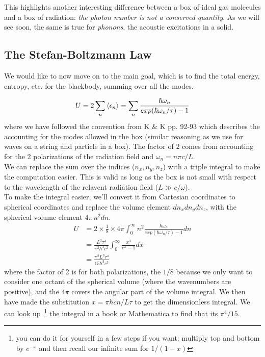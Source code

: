 This highlights another interesting difference between
a box of ideal gas molecules and a box of radiation: \emph{the photon number is
not a conserved quantity}. As we will see soon, the same is true for 
\textit{phonons}, the acoustic excitations in a solid.


\subsection{The Stefan-Boltzmann Law}
We would like to now move on to the main goal, which is to find the total energy,
entropy, etc. for the blackbody, summing over all the modes.

\begin{equation}
U = 2 \sum_n \Braket{\epsilon_n} = 
\sum_n \frac{\hbar \omega_n}{exp(\hbar \omega_n / \tau) - 1}
\end{equation}
where we have followed the convention from K \& K pp. 92-93 which describes
the accounting for the modes allowed in the box (similar reasoning as we use
for waves on a string and particle in a box). The factor of 2 comes from accounting
for the 2 polarizations of the radiation field and $\omega_n = n \pi c/L$.\\

We can replace the sum over the indices ($n_x, n_y, n_z$) with a triple integral
to make the computation easier. This is valid as long as the box is not small
with respect to the wavelength of the relavent radiation field ($L \gg c/\omega$).\\

To make the integral easier, we'll convert it from Cartesian coordinates to
spherical coordinates and replace the volume element $dn_x dn_y dn_z$, with
the spherical volume element $4 \pi\,n^2 dn$.
\begin{align}
U &= 2 \times \frac{1}{8} \times 4 \pi 
\int_{0}^{\infty} n^2 \frac{\hbar \omega_n}{exp(\hbar \omega_n / \tau) - 1} dn \\
  &= \frac{L^3 \tau^4}{\pi^2 \hbar^3 c^3} \int_{0}^{\infty} \frac{x^3}{e^x - 1} dx \\
  &= \frac{\pi^2 L^3 \tau^4}{15 \hbar^3 c^3}
\end{align}
where the factor of 2 is for both polarizations, the $1/8$ because we only want to consider one octant of the spherical volume (where the wavenumbers are positive), and the $4 \pi$ covers the angular part of the volume integral. We then have made the substitution $x = \pi \hbar c n / L \tau$ to get the dimensionless 
integral. We can look up~\footnote{you can do it for yourself in a few steps if you want: multiply top and bottom by $e^{-x}$ and then recall our infinite sum for 
$1/(1-x)$} the integral in a book or Mathematica to find that its $\pi^4/15$.

